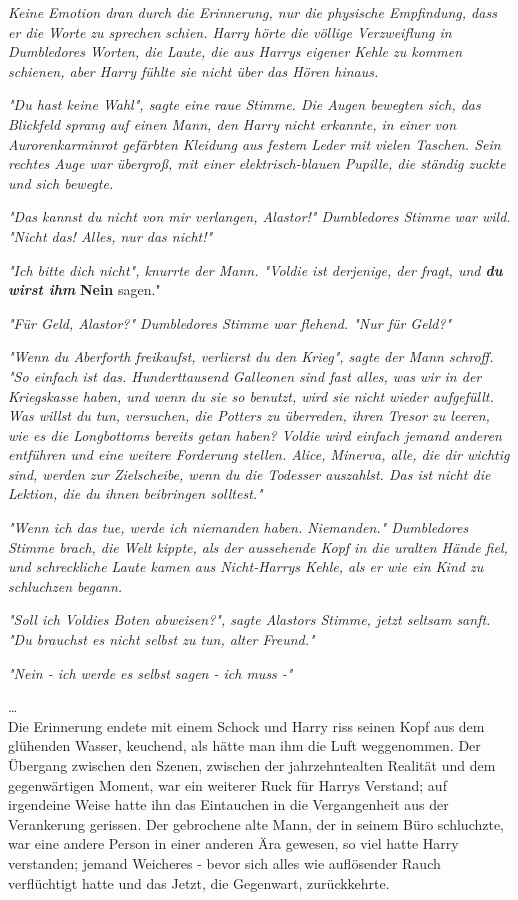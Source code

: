 {\emph{Keine Emotion dran durch die Erinnerung, nur die physische Empfindung, dass er die Worte zu sprechen schien. Harry hörte die völlige Verzweiflung in Dumbledores Worten, die Laute, die aus Harrys eigener Kehle zu kommen schienen, aber Harry fühlte sie nicht über das Hören hinaus.}

\emph{"Du hast keine Wahl", sagte eine raue Stimme. Die Augen bewegten sich, das Blickfeld sprang auf einen Mann, den Harry nicht erkannte, in einer von Aurorenkarminrot gefärbten Kleidung aus festem Leder mit vielen Taschen. Sein rechtes Auge war übergroß, mit einer elektrisch-blauen Pupille, die ständig zuckte und sich bewegte.}

\emph{"Das kannst du nicht von mir verlangen, Alastor!" Dumbledores Stimme war wild. "Nicht das! Alles, nur das nicht!"}

\emph{"Ich bitte dich nicht", knurrte der Mann. "Voldie ist derjenige, der fragt, und \textbf{du wirst ihm}} \textbf{Nein} sagen."

\emph{"Für Geld, Alastor?" Dumbledores Stimme war flehend. "Nur für Geld?"}

\emph{"Wenn du Aberforth freikaufst, verlierst du den Krieg", sagte der Mann schroff. "So einfach ist das. Hunderttausend Galleonen sind fast alles, was wir in der Kriegskasse haben, und wenn du sie so benutzt, wird sie nicht wieder aufgefüllt. Was willst du tun, versuchen, die Potters zu überreden, ihren Tresor zu leeren, wie es die Longbottoms bereits getan haben? Voldie wird einfach jemand anderen entführen und eine weitere Forderung stellen. Alice, Minerva, alle, die dir wichtig sind, werden zur Zielscheibe, wenn du die Todesser auszahlst. Das ist nicht die Lektion, die du ihnen beibringen solltest."}

\emph{"Wenn ich das tue, werde ich niemanden haben. Niemanden." Dumbledores Stimme brach, die Welt kippte, als der aussehende Kopf in die uralten Hände fiel, und schreckliche Laute kamen aus Nicht-Harrys Kehle, als er wie ein Kind zu schluchzen begann.}

\emph{"Soll ich Voldies Boten abweisen?", sagte Alastors Stimme, jetzt seltsam sanft. "Du brauchst es nicht selbst zu tun, alter Freund."}

\emph{"Nein - ich werde es selbst sagen - ich muss -"}

…\\ Die Erinnerung endete mit einem Schock und Harry riss seinen Kopf aus dem glühenden Wasser, keuchend, als hätte man ihm die Luft weggenommen. Der Übergang zwischen den Szenen, zwischen der jahrzehntealten Realität und dem gegenwärtigen Moment, war ein weiterer Ruck für Harrys Verstand; auf irgendeine Weise hatte ihn das Eintauchen in die Vergangenheit aus der Verankerung gerissen. Der gebrochene alte Mann, der in seinem Büro schluchzte, war eine andere Person in einer anderen Ära gewesen, so viel hatte Harry verstanden; jemand Weicheres - bevor sich alles wie auflösender Rauch verflüchtigt hatte und das Jetzt, die Gegenwart, zurückkehrte.

}
